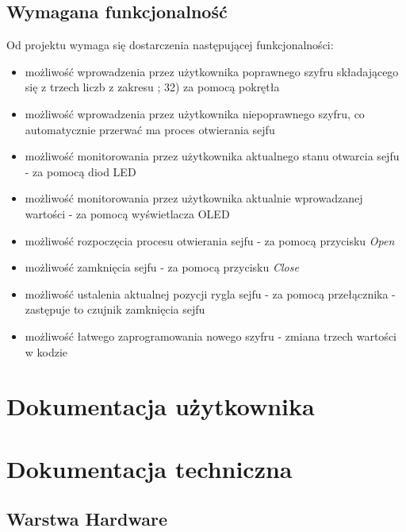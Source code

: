 \documentclass[12pt] {article}
\begin{document}
\subsection{Wymagana funkcjonalność}
Od projektu wymaga się dostarczenia następującej funkcjonalności:
\begin{itemize}
\item możliwość wprowadzenia przez użytkownika poprawnego szyfru składającego się z trzech liczb z zakresu ; 32) za pomocą pokrętła
\item możliwość wprowadzenia przez użytkownika niepoprawnego szyfru, co automatycznie przerwać ma proces otwierania sejfu
\item możliwość monitorowania przez użytkownika aktualnego stanu otwarcia sejfu - za pomocą diod LED
\item możliwość monitorowania przez użytkownika aktualnie wprowadzanej wartości - za pomocą wyświetlacza OLED
\item możliwość rozpoczęcia procesu otwierania sejfu - za pomocą przycisku \textit{Open}
\item możliwość zamknięcia sejfu - za pomocą przycisku \textit{Close}
\item możliwość ustalenia aktualnej pozycji rygla sejfu - za pomocą przełącznika - zastępuje to czujnik zamknięcia sejfu
\item możliwość łatwego zaprogramowania nowego szyfru - zmiana trzech wartości w kodzie 
\end{itemize}




\section{Dokumentacja użytkownika}




\section{Dokumentacja techniczna}

\subsection{Warstwa Hardware}
\end{document}

